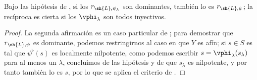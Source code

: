 \documentclass[oneside,10pt]{amsart}
\newcommand{\oldpage}[2][]{\marginnote{\normalfont\footnotesize\textbf{#1}~|~#2}\ignorespaces}
\let\EGAOriginalLabel\label
\renewcommand{\label}[1]{\phantomsection\EGAOriginalLabel{#1}}
\begin{document}
\begin{corollary}[3.7.8]
\label{II.3.7.8}
Bajo las hipótesis de , si los $r_{\sh{L},\psi_\lambda}$ son dominantes, también lo es $r_{\sh{L},\psi}$;
la recíproca es cierta si los $\vphi_\lambda$ son todos inyectivos.
\end{corollary}

\oldpage[II]{68}
\begin{proof}
La segunda afirmación es un caso particular de ;
para demostrar que $r_{\sh{L},\psi}$ es dominante, podemos restringirnos al caso en que $Y$ es afín;
si $s\in S$ es tal que $\psi^\flat(s)$ es localmente nilpotente, como podemos escribir $s=\vphi_\lambda(s_\lambda)$ para al menos un $\lambda$, concluimos de las hipótesis y de  que $s_\lambda$ es nilpotente, y por tanto también lo es $s$, por lo que se aplica el criterio de .
\end{proof}
\end{document}
